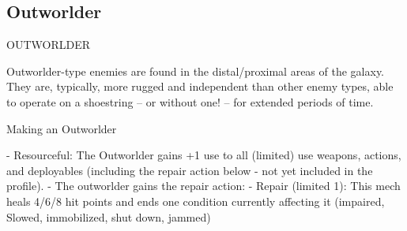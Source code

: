\subsection{Outworlder}
                                            OUTWORLDER

Outworlder-type enemies are found in the distal/proximal areas of the galaxy. They are, typically,
more rugged and independent than other enemy types, able to operate on a shoestring -- or
without one! -- for extended periods of time.


Making an Outworlder


    -    Resourceful: The Outworlder gains +1 use to all (limited) use weapons, actions, and
        deployables (including the repair action below - not yet included in the profile).
    -   The outworlder gains the repair action:
             -   Repair (limited 1): This mech heals 4/6/8 hit points and ends one condition
                 currently affecting it (impaired, Slowed, immobilized, shut down, jammed)

